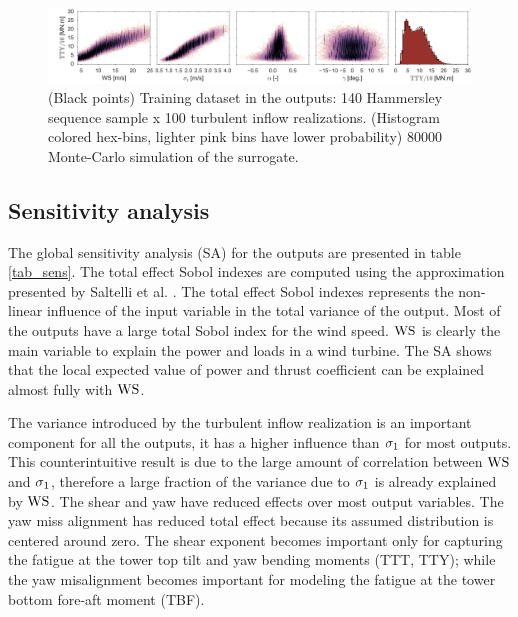 \documentclass[preprint,12pt]{elsarticle}
\begin{document}
\begin{figure}[p]
\begin{centering}
\includegraphics[width=\columnwidth]{Figures/Full_surrogate_red_file/TTYBM_EFL_M4_PCE_MC_surrogate_last_row.jpg}
\caption{(Black points) Training dataset in the outputs: 140 Hammersley sequence sample x 100 turbulent inflow realizations. (Histogram colored hex-bins, lighter pink bins have lower probability) 80000 Monte-Carlo simulation of the surrogate.}
\label{fig_final_surrogates}
\end{centering}
\end{figure}

\subsection{Sensitivity analysis}

The global sensitivity analysis (SA) for the outputs are presented in table \ref{tab_sens}. The total effect Sobol indexes are computed using the approximation presented by Saltelli et al. \cite{saltelli2010variance}. The total effect Sobol indexes represents the non-linear influence of the input variable in the total variance of the output. Most of the outputs have a large total Sobol index for the wind speed. $\text{WS}$ is clearly the main variable to explain the power and loads in a wind turbine. The SA shows that the local expected value of power and thrust coefficient can be explained almost fully with $\text{WS}$.

The variance introduced by the turbulent inflow realization is an important component for all the outputs, it has a higher influence than $\sigma_{1}$ for most outputs. This counterintuitive result is due to the large amount of correlation between $\text{WS}$ and $\sigma_{1}$, therefore a large fraction of the variance due to $\sigma_{1}$ is already explained by $\text{WS}$. The shear and yaw have reduced effects over most output variables. The yaw miss alignment has reduced total effect because its assumed distribution is centered around zero. The shear exponent becomes important only for capturing the fatigue at the tower top tilt and yaw bending moments (TTT, TTY); while the yaw misalignment becomes important for modeling the fatigue at the tower bottom fore-aft moment (TBF).
\end{document}

